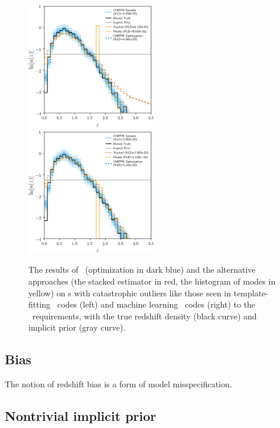 \begin{figure}
	\includegraphics[width=0.5\textwidth]{figures/chippr/thesis_eout_log_estimators.png}
	\includegraphics[width=0.5\textwidth]{figures/chippr/thesis_rout_log_estimators.png}
	\caption{
		The results of \Chippr\ (optimization in dark blue) and the alternative approaches (the stacked estimator in red, the histogram of modes in yellow) on \pzpdf s with catastrophic outliers like those seen in template-fitting \pzpdf\ codes (left) and machine learning \pzpdf\ codes (right) to the \lsst\ requirements, with the true redshift density (black curve) and implicit prior (gray curve).
	}
\end{figure}

\subsection{Bias}

The notion of redshift bias is a form of model misspecification.


\subsection{Nontrivial implicit prior}

